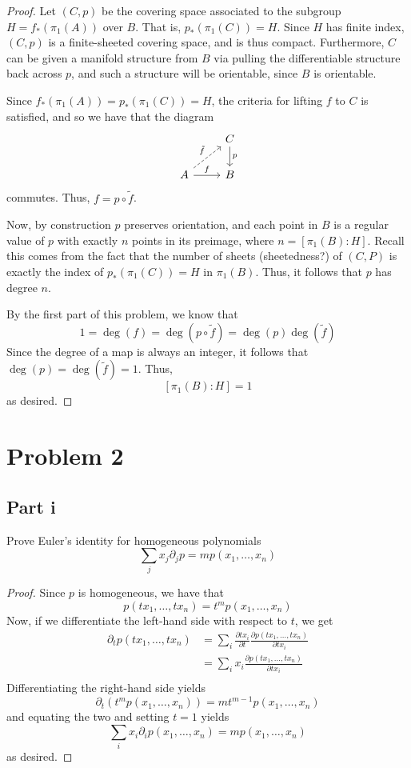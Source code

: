 \documentclass[fontsize=11pt]{scrartcl} %
\numberwithin{equation}{section} %
\numberwithin{figure}{section} %
\numberwithin{table}{section} %
\begin{document}
\begin{proof}
    Let $(C,p)$ be the covering space associated to the subgroup $H =
    f_*(\pi_1(A))$ over $B$. That is, $p_*(\pi_1(C)) =H$. Since $H$
    has finite index, $(C,p)$ is a finite-sheeted covering space, and is thus
    compact. Furthermore, $C$ can be given a manifold structure from $B$
    via pulling the differentiable structure back across $p$, and such a
    structure will be orientable, since $B$ is orientable. 

    Since $f_*(\pi_1(A)) = p_*(\pi_1(C)) =H$, the criteria for lifting $f$ to
    $C$ is satisfied, and so we have that the diagram
    \[
        \begin{tikzcd}
            &C\arrow{d}{p}\\
            A\arrow{r}{f}\arrow[dashed]{ur}{\tilde{f}}&B
        \end{tikzcd}
    \]
    commutes. Thus, $f = p\circ \tilde{f}$.

    Now, by construction $p$ preserves orientation, and each point in $B$ is a
    regular value of $p$ with exactly $n$ points in its preimage, where
    $n=[\pi_1(B):H]$. Recall this comes from the fact that the number of sheets
    (sheetedness?) of $(C,P)$ is exactly the index of $p_*(\pi_1(C))=H$ in
    $\pi_1(B)$. Thus, it follows that $p$ has degree $n$.

    By the first part of this problem, we know that
    \[
        1 = \deg(f) = \deg(p\circ \tilde{f}) = \deg(p)\deg(\tilde{f})
    \]
    Since the degree of a map is always an integer, it follows that
    $\deg(p)=\deg(\tilde{f}) = 1$. Thus,
    \[
        [\pi_1(B):H]=1
    \]
    as desired.

\end{proof}

\newpage

\section*{Problem 2}
\subsection*{Part i}
Prove Euler's identity for homogeneous polynomials
\[
    \sum_j x_j\partial_jp = mp(x_1,\dots,x_n)
\]

\begin{proof}
    Since $p$ is homogeneous, we have that
    \[
        p(tx_1,\dots,tx_n) = t^mp(x_1,\dots,x_n)
    \]
    Now, if we differentiate the left-hand side with respect to $t$, we get
    \[
\begin{aligned}
    \partial_tp(tx_1,\dots,tx_n) &= \sum_i\frac{\partial tx_i}{\partial
    t}\frac{\partial p(tx_1,\dots,tx_n)}{\partial tx_i}\\
    &=\sum_ix_i\frac{\partial p(tx_1,\dots,tx_n)}{\partial tx_i}\\
\end{aligned}
    \]
    Differentiating the right-hand side yields
    \[
        \partial_t (t^mp(x_1,\dots,x_n)) = mt^{m-1}p(x_1,\dots,x_n)
    \]
    and equating the two and setting $t=1$ yields
    \[
        \sum_i x_i\partial_ip(x_1,\dots,x_n) = mp(x_1,\dots,x_n)
    \]
    as desired.
\end{proof}
\end{document}
